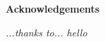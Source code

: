\thispagestyle{empty}

\begin{center}
  {\bf \Huge Acknowledgements}
\end{center}

\vspace{4cm}


\emph{
  ...thanks to... hello
}
